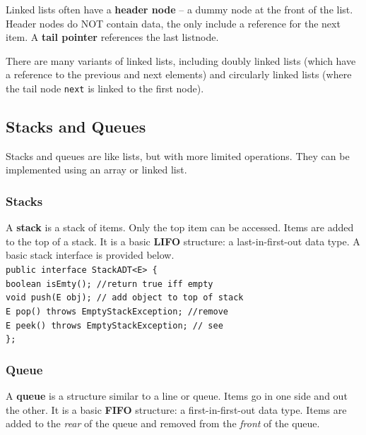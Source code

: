 Linked lists often have a \textbf{header node} -- a dummy node at the front of the list. Header nodes do NOT contain data, the only include a reference for the next item. A \textbf{tail pointer} references the last listnode. 

There are many variants of linked lists, including doubly linked lists (which have a reference to the previous and next elements) and circularly linked lists (where the tail node \texttt{next} is linked to the first node). 

\subsection{Stacks and Queues}

Stacks and queues are like lists, but with more limited operations. They can be implemented using an array or linked list. 

\subsubsection{Stacks}

A \textbf{stack} is a stack of items. Only the top item can be accessed. Items are added to the top of a stack. It is a basic \textbf{LIFO} structure: a last-in-first-out data type. A basic stack interface is provided below. \\

\texttt{public interface StackADT<E> \{} \\
\indent \indent \texttt{boolean isEmty(); //return true iff empty} \\
\indent \indent \texttt{void push(E obj); // add object to top of stack} \\
\indent \indent \texttt{E pop() throws EmptyStackException; //remove} \\
\indent \indent \texttt{E peek() throws EmptyStackException; // see} \\
\indent \texttt{\};} \\

\subsubsection{Queue}

A \textbf{queue} is a structure similar to a line or queue. Items go in one side and out the other. It is a basic \textbf{FIFO} structure: a first-in-first-out data type. Items are added to the \textit{rear} of the queue and removed from the \textit{front} of the queue. \\

